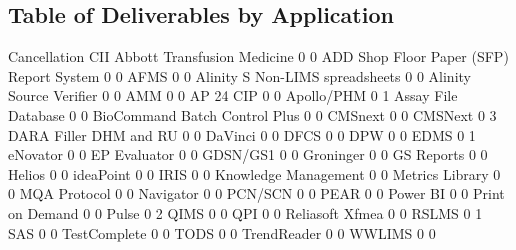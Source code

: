 \documentclass{article}
\begin{document}
\subsection{Table of Deliverables by Application}
\begin{Schunk}
\begin{Soutput}
                                           Cancellation CII
  Abbott Transfusion Medicine                         0   0
  ADD Shop Floor Paper (SFP) Report System            0   0
  AFMS                                                0   0
  Alinity S Non-LIMS spreadsheets                     0   0
  Alinity Source Verifier                             0   0
  AMM                                                 0   0
  AP 24 CIP                                           0   0
  Apollo/PHM                                          0   1
  Assay File Database                                 0   0
  BioCommand Batch Control Plus                       0   0
  CMSnext                                             0   0
  CMSNext                                             0   3
  DARA Filler DHM and RU                              0   0
  DaVinci                                             0   0
  DFCS                                                0   0
  DPW                                                 0   0
  EDMS                                                0   1
  eNovator                                            0   0
  EP Evaluator                                        0   0
  GDSN/GS1                                            0   0
  Groninger                                           0   0
  GS Reports                                          0   0
  Helios                                              0   0
  ideaPoint                                           0   0
  IRIS                                                0   0
  Knowledge Management                                0   0
  Metrics Library                                     0   0
  MQA Protocol                                        0   0
  Navigator                                           0   0
  PCN/SCN                                             0   0
  PEAR                                                0   0
  Power BI                                            0   0
  Print on Demand                                     0   0
  Pulse                                               0   2
  QIMS                                                0   0
  QPI                                                 0   0
  Reliasoft Xfmea                                     0   0
  RSLMS                                               0   1
  SAS                                                 0   0
  TestComplete                                        0   0
  TODS                                                0   0
  TrendReader                                         0   0
  WWLIMS                                              0   0
                                          

\end{Soutput}
\end{Schunk}
\end{document}
